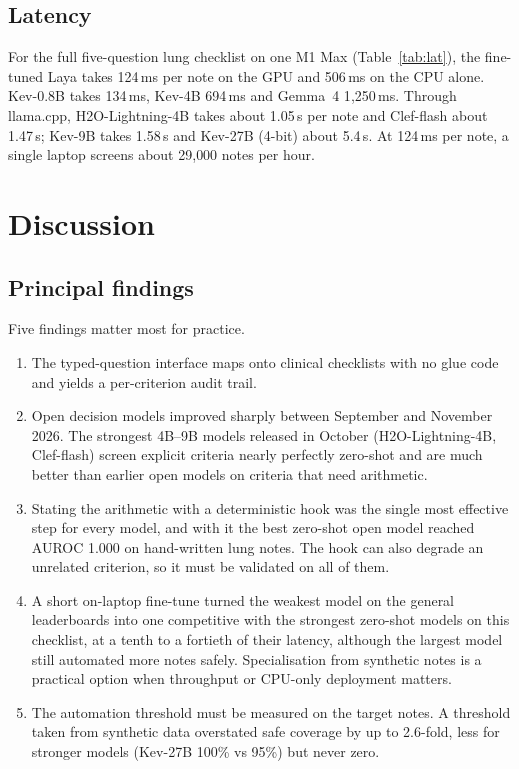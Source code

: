 \documentclass[11pt]{article}
\begin{document}
\subsection{Latency}
\label{sec:res-latency}
For the full five-question lung checklist on one M1 Max (Table~\ref{tab:lat}), the fine-tuned Laya takes 124\,ms per note on the GPU and 506\,ms on the CPU alone.
Kev-0.8B takes 134\,ms, Kev-4B 694\,ms and Gemma~4 1{,}250\,ms.
Through llama.cpp, H2O-Lightning-4B takes about 1.05\,s per note and Clef-flash about 1.47\,s; Kev-9B takes 1.58\,s and Kev-27B (4-bit) about 5.4\,s.
At 124\,ms per note, a single laptop screens about 29{,}000 notes per hour.


\section{Discussion}
\label{sec:discussion}

\subsection{Principal findings}
Five findings matter most for practice.
\begin{enumerate}[nosep]
\item The typed-question interface maps onto clinical checklists with no glue code and yields a per-criterion audit trail.
\item Open decision models improved sharply between September and November 2026. The strongest 4B--9B models released in October (H2O-Lightning-4B, Clef-flash) screen explicit criteria nearly perfectly zero-shot and are much better than earlier open models on criteria that need arithmetic.
\item Stating the arithmetic with a deterministic hook was the single most effective step for every model, and with it the best zero-shot open model reached AUROC 1.000 on hand-written lung notes. The hook can also degrade an unrelated criterion, so it must be validated on all of them.
\item A short on-laptop fine-tune turned the weakest model on the general leaderboards into one competitive with the strongest zero-shot models on this checklist, at a tenth to a fortieth of their latency, although the largest model still automated more notes safely. Specialisation from synthetic notes is a practical option when throughput or CPU-only deployment matters.
\item The automation threshold must be measured on the target notes. A threshold taken from synthetic data overstated safe coverage by up to 2.6-fold, less for stronger models (Kev-27B 100\% vs 95\%) but never zero.
\end{enumerate}
\end{document}
